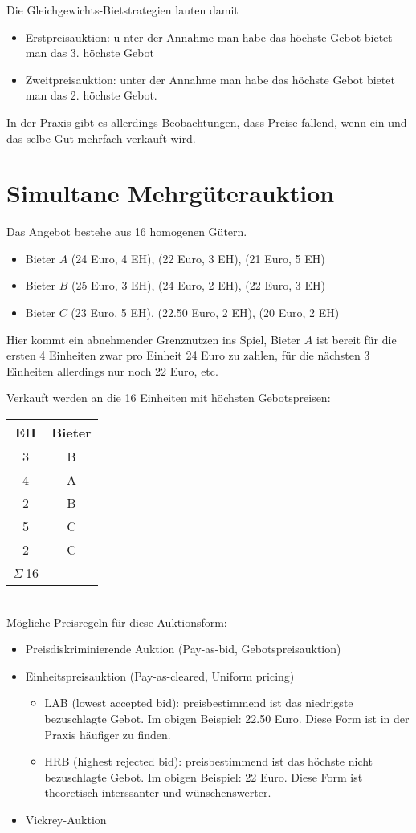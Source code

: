 \documentclass[12pt]{extreport} %
\theoremstyle{named}
\theoremstyle{itshape}
\theoremstyle{normal}
\begin{document}
Die Gleichgewichts-Bietstrategien lauten damit
\begin{itemize}
	\item Erstpreisauktion: u nter der Annahme man habe das höchste Gebot bietet man das 3. höchste Gebot
	\item Zweitpreisauktion: unter der Annahme man habe das höchste Gebot bietet man das 2. höchste Gebot.
\end{itemize}

In der Praxis gibt es allerdings Beobachtungen, dass Preise fallend, wenn ein und das selbe Gut mehrfach verkauft wird. ~\newpage

\section{Simultane Mehrgüterauktion}

Das Angebot bestehe aus 16 homogenen Gütern.

\begin{itemize}
	\item Bieter $A$ (24 Euro, 4 EH), (22 Euro, 3 EH), (21 Euro, 5 EH)
	\item Bieter $B$ (25 Euro, 3 EH), (24 Euro, 2 EH), (22 Euro, 3 EH)
	\item Bieter $C$ (23 Euro, 5 EH), (22.50 Euro, 2 EH), (20 Euro, 2 EH)
\end{itemize}
Hier kommt ein abnehmender Grenznutzen ins Spiel, Bieter $A$ ist bereit für die ersten 4 Einheiten zwar pro Einheit 24 Euro zu zahlen, für die nächsten 3 Einheiten allerdings nur noch 22 Euro, etc.

Verkauft werden an die 16 Einheiten mit höchsten Gebotspreisen: ~
\begin{tabular}{c|c}
  EH & Bieter  \\
  \hline
  3 & B \\
  4 & A \\
  2 & B \\
  5 & C \\
  2 & C \\
  \hline
  $\Sigma ~$16 & ~
\end{tabular} ~\\

Mögliche Preisregeln für diese Auktionsform:
\begin{itemize}
	\item Preisdiskriminierende Auktion (Pay-as-bid, Gebotspreisauktion)
	\item Einheitspreisauktion (Pay-as-cleared, Uniform pricing)
		\begin{itemize}
			\item LAB (lowest accepted bid): preisbestimmend ist das niedrigste bezuschlagte Gebot. Im obigen Beispiel: 22.50 Euro. Diese Form ist in der Praxis häufiger zu finden.
			\item HRB (highest rejected bid): preisbestimmend ist das höchste nicht bezuschlagte Gebot. Im obigen Beispiel: 22 Euro. Diese Form ist theoretisch interssanter und wünschenswerter.
		\end{itemize} 
	\item Vickrey-Auktion
\end{itemize}
\end{document}
